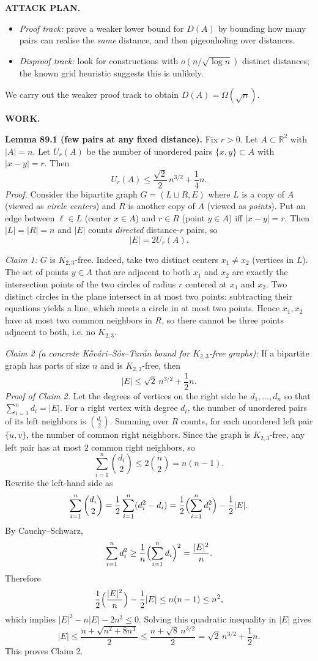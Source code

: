 \medskip
\noindent\textbf{ATTACK PLAN.}
\begin{itemize}
\item \emph{Proof track:} prove a weaker lower bound for $D(A)$ by bounding how many pairs can realise the \emph{same} distance, and then pigeonholing over distances.
\item \emph{Disproof track:} look for constructions with $o(n/\sqrt{\log n})$ distinct distances; the known grid heuristic suggests this is unlikely.
\end{itemize}
We carry out the weaker proof track to obtain $D(A)=\Omega(\sqrt n)$.

\medskip
\noindent\textbf{WORK.}

\smallskip
\noindent\textbf{Lemma 89.1 (few pairs at any fixed distance).}
Fix $r>0$. Let $A\subset\mathbb{R}^2$ with $|A|=n$.
Let $U_r(A)$ be the number of unordered pairs $\{x,y\}\subset A$ with $|x-y|=r$.
Then
\[
U_r(A)\le \frac{\sqrt 2}{2}\,n^{3/2}+\frac14 n.
\]
\textit{Proof.}
Consider the bipartite graph $G=(L\sqcup R,E)$ where $L$ is a copy of $A$ (viewed as \emph{circle centers}) and $R$ is another copy of $A$ (viewed as \emph{points}). Put an edge between $\ell\in L$ (center $x\in A$) and $r\in R$ (point $y\in A$) iff $|x-y|=r$. Then $|L|=|R|=n$ and $|E|$ counts \emph{directed} distance-$r$ pairs, so
\[
|E|=2U_r(A).
\]

\emph{Claim 1:} $G$ is $K_{2,3}$-free.
Indeed, take two distinct centers $x_1\ne x_2$ (vertices in $L$). The set of points $y\in A$ that are adjacent to both $x_1$ and $x_2$ are exactly the intersection points of the two circles of radius $r$ centered at $x_1$ and $x_2$. Two distinct circles in the plane intersect in at most two points: subtracting their equations yields a line, which meets a circle in at most two points. Hence $x_1,x_2$ have at most two common neighbors in $R$, so there cannot be three points adjacent to both, i.e. no $K_{2,3}$.

\emph{Claim 2 (a concrete Kővári--Sós--Turán bound for $K_{2,3}$-free graphs):}
If a bipartite graph has parts of size $n$ and is $K_{2,3}$-free, then
\[
|E|\le \sqrt 2\,n^{3/2}+\frac12 n.
\]
\emph{Proof of Claim 2.}
Let the degrees of vertices on the right side be $d_1,\dots,d_n$ so that $\sum_{i=1}^n d_i=|E|$.
For a right vertex with degree $d_i$, the number of unordered pairs of its left neighbors is $\binom{d_i}{2}$.
Summing over $R$ counts, for each unordered left pair $\{u,v\}$, the number of common right neighbors.
Since the graph is $K_{2,3}$-free, any left pair has at most $2$ common right neighbors, so
\[
\sum_{i=1}^n \binom{d_i}{2} \le 2\binom{n}{2}=n(n-1).
\]
Rewrite the left-hand side as
\[
\sum_{i=1}^n \binom{d_i}{2}=
\frac12\sum_{i=1}^n(d_i^2-d_i)
=
\frac12\Bigl(\sum_{i=1}^n d_i^2\Bigr)-\frac12|E|.
\]
By Cauchy--Schwarz,
\[
\sum_{i=1}^n d_i^2 \ge \frac1n\Bigl(\sum_{i=1}^n d_i\Bigr)^2 = \frac{|E|^2}{n}.
\]
Therefore
\[
\frac12\Bigl(\frac{|E|^2}{n}\Bigr)-\frac12|E|
\le n(n-1)
\le n^2,
\]
which implies $|E|^2 - n|E| -2n^3\le 0$.
Solving this quadratic inequality in $|E|$ gives
\[
|E|\le \frac{n+\sqrt{n^2+8n^3}}{2}\le \frac{n+\sqrt{8}\,n^{3/2}}{2}=\sqrt 2\,n^{3/2}+\frac12 n.
\]
This proves Claim 2.


